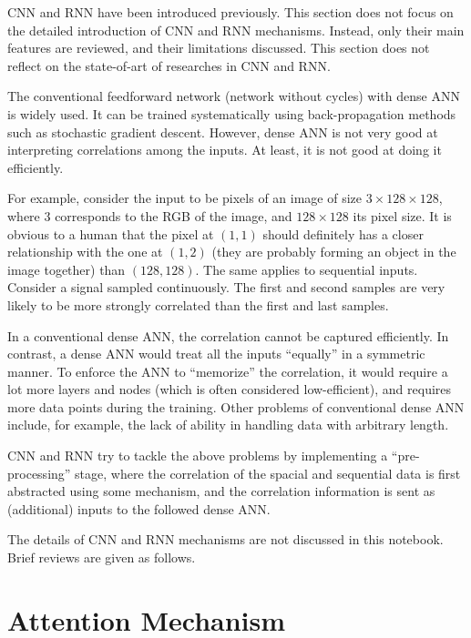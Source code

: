 CNN and RNN have been introduced previously. This section does not focus on the detailed introduction of CNN and RNN mechanisms. Instead, only their main features are reviewed, and their limitations discussed. This section does not reflect on the state-of-art of researches in CNN and RNN.

The conventional feedforward network (network without cycles) with dense ANN is widely used. It can be trained systematically using back-propagation methods such as stochastic gradient descent. However, dense ANN is not very good at interpreting correlations among the inputs. At least, it is not good at doing it efficiently.

For example, consider the input to be pixels of an image of size $3\times 128 \times 128$, where $3$ corresponds to the RGB of the image, and $128 \times 128$ its pixel size. It is obvious to a human that the pixel at $(1,1)$ should definitely has a closer relationship with the one at $(1,2)$ (they are probably forming an object in the image together) than $(128, 128)$. The same applies to sequential inputs. Consider a signal sampled continuously. The first and second samples are very likely to be more strongly correlated than the first and last samples.

In a conventional dense ANN, the correlation cannot be captured efficiently. In contrast, a dense ANN would treat all the inputs ``equally'' in a symmetric manner. To enforce the ANN to ``memorize'' the correlation, it would require a lot more layers and nodes (which is often considered low-efficient), and requires more data points during the training. Other problems of conventional dense ANN include, for example, the lack of ability in handling data with arbitrary length.

CNN and RNN try to tackle the above problems by implementing a ``pre-processing'' stage, where the correlation of the spacial and sequential data is first abstracted using some mechanism, and the correlation information is sent as (additional) inputs to the followed dense ANN.

The details of CNN and RNN mechanisms are not discussed in this notebook. Brief reviews are given as follows.





\section{Attention Mechanism}

